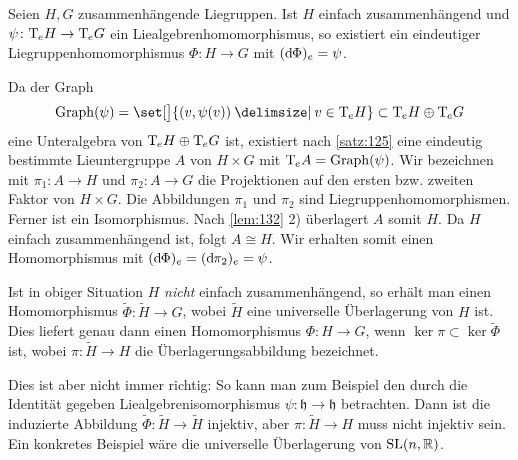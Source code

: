 \begin{lemma}[label=lem:134,{name=[{Liegruppenhomomorphismus aus Liealgebrenhomomorphismus wenn einfach zusammenhängend}]}]
	Seien $H,G$ zusammenhängende Liegruppen.
	Ist $H$ einfach zusammenhängend und $\psi \colon \mathrm{T}\mkern-0.85mu_e H \to \mathrm{T}\mkern-0.85mu_e G$ ein Liealgebrenhomomorphismus, so existiert ein eindeutiger Liegruppenhomomorphismus $\Phi \colon H \to G$ mit $(\mathrm{d}\mkern-1.0mu \Phi)_e = \psi$.
\end{lemma}
\begin{beweis}
	Da der Graph
	\[
		\Graph(\psi) = \set[\big]{\enbrace*{v,\psi(v)} \given v \in \Tmap_e H} \subset \Tmap_e H \oplus \Tmap_e G
	\]
	eine Unteralgebra von $\mathrm{T}\mkern-0.85mu_e H \oplus \mathrm{T}\mkern-0.85mu_e G$ ist, existiert nach \autoref{satz:125} eine eindeutig bestimmte Lieuntergruppe $A$ von $H \times G$ mit $\mathrm{T}\mkern-0.85mu_e A = \operatorname{Graph}(\psi)$.
	Wir bezeichnen mit $\pi_1 \colon A \to H$ und $\pi_2 \colon A \to G$ die Projektionen auf den ersten bzw. zweiten Faktor von $H \times G$.
	Die Abbildungen $\pi_1$ und $\pi_2$ sind Liegruppenhomomorphismen.
	Ferner ist 
	ein Isomorphismus.
	Nach \autoref{lem:132} 2) überlagert $A$ somit $H$.
	Da $H$ einfach zusammenhängend ist, folgt $A \cong H$.
	Wir erhalten somit einen Homomorphismus 
	mit $(\mathrm{d}\mkern-1.0mu \Phi)_e = (\mathrm{d}\mkern-1.0mu \pi_2)_e = \psi$.
\end{beweis}

Ist in obiger Situation $H$ \emph{nicht} einfach zusammenhängend, so erhält man einen Homomorphismus $\tilde{\Phi} \colon \tilde{H} \to G$, wobei $\tilde{H}$ eine universelle Überlagerung von $H$ ist.
Dies liefert genau dann einen Homomorphismus $\Phi \colon H \to G$, wenn $\ker \pi \subset \ker \tilde{\Phi}$ ist, wobei $\pi \colon \tilde{H} \to H$ die Überlagerungsabbildung bezeichnet.

Dies ist aber nicht immer richtig:
So kann man zum Beispiel den durch die Identität gegeben Liealgebrenisomorphismus $\psi \colon \mathfrak{h} \to \mathfrak{h}$ betrachten.
Dann ist die induzierte Abbildung $\tilde{\Phi} \colon \tilde{H} \to \tilde{H}$ injektiv, aber $\pi \colon \tilde{H} \to H$ muss nicht injektiv sein.
Ein konkretes Beispiel wäre die universelle Überlagerung von $\operatorname{SL}(n,\mathbb{R})$.

